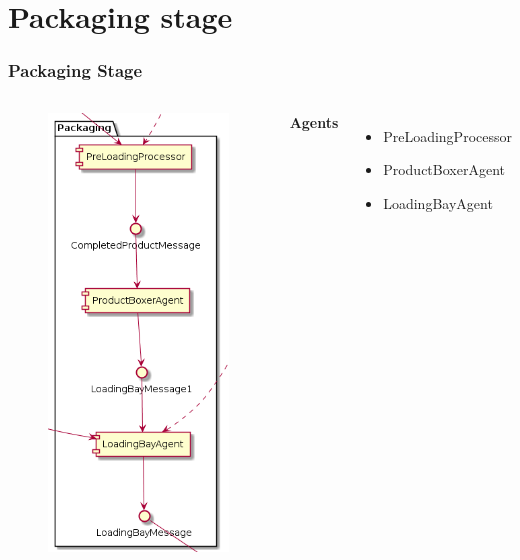 \documentclass{beamer}
\begin{document}
\section{Packaging stage}%
\label{sec:packaging_stage}
\begin{frame}
    \frametitle{\huge{Packaging Stage}}
    \begin{columns}[t]
        \begin{figure}[H]
            \centering
            \includegraphics[width=0.55\linewidth]{packaging_component_diagram.png}
        \end{figure}
            \textbf{Agents}
            \begin{itemize}
                \item PreLoadingProcessor
                \item ProductBoxerAgent
                \item LoadingBayAgent
            \end{itemize}
    \end{columns}
\end{frame}
\end{document}
